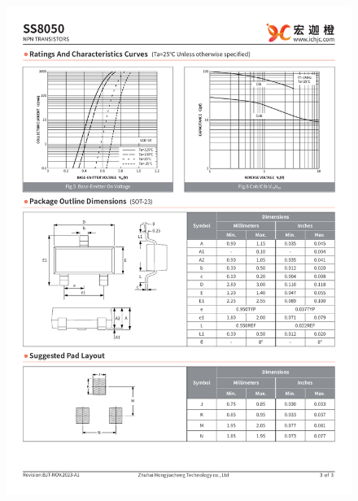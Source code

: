 \documentclass[UTF8]{article}
\begin{document}
\begin{figure}[H]\centering
    \includegraphics[width=\columnwidth]{preview/assets/SS8050_4.pdf}
\end{figure}
\end{document}
